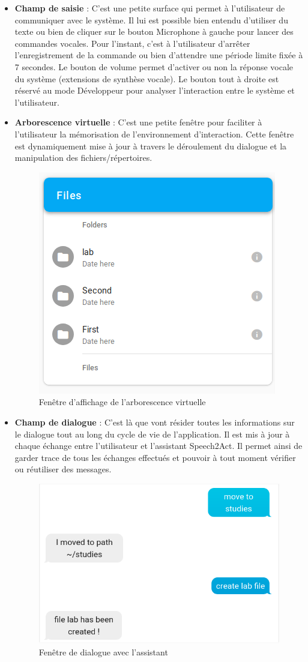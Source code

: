 \begin{itemize}
	\item \textbf{Champ de saisie} : C'est une petite surface qui permet à l'utilisateur de communiquer avec le système. Il lui est possible bien entendu d'utiliser du texte ou bien de cliquer sur le bouton Microphone à gauche pour lancer des commandes vocales. Pour l'instant, c'est à l'utilisateur d'arrêter l'enregistrement de la commande ou bien d'attendre une période limite fixée à 7 secondes. Le bouton de volume permet d'activer ou non la réponse vocale du système (extensions de synthèse vocale). Le bouton tout à droite est réservé au mode Développeur pour analyser l'interaction entre le système et l'utilisateur.
	
	\item \textbf{Arborescence virtuelle} : C'est une petite fenêtre pour faciliter à l'utilisateur la mémorisation de l'environnement d'interaction. Cette fenêtre est dynamiquement mise à jour à travers le déroulement du dialogue et la manipulation des fichiers/répertoires.
	
	\begin{figure}[H]
		\centering
		\includegraphics[width=.4\linewidth]{images/implementation/app_screens/tree.png}
		\caption{Fenêtre d'affichage de l'arborescence virtuelle}
	\end{figure} 
	
	\item \textbf{Champ de dialogue} : C'est là que vont résider toutes les informations sur le dialogue tout au long du cycle de vie de l'application. Il est mis à jour à chaque échange entre l'utilisateur et l'assistant Speech2Act. Il permet ainsi de garder trace de tous les échanges effectués et pouvoir à tout moment vérifier ou réutiliser des messages.
	\begin{figure}[H]
		\centering
		\includegraphics[width=.6\linewidth]{images/implementation/app_screens/dialog.png}
		\caption{Fenêtre de dialogue avec l'assistant}
	\end{figure} 
	

\end{itemize}
